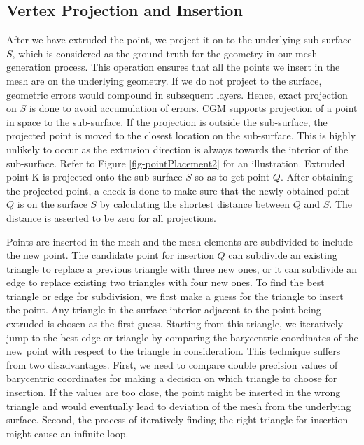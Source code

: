 \subsection{Vertex Projection and Insertion}

After we have extruded the point, we project it on to the underlying sub-surface $S$, which is considered as the ground truth for the geometry in our mesh generation process. This operation ensures that all the  points we insert in the mesh are on the underlying geometry. If we do not project to the surface, geometric errors would compound in subsequent layers. Hence, exact projection on $S$ is done to avoid accumulation of errors. CGM supports projection of a point in space to the sub-surface. If the projection is outside the sub-surface, the projected point is moved to the closest location on the sub-surface. This is highly unlikely to occur as the extrusion direction is always towards the interior of the sub-surface. Refer to Figure \ref{fig-pointPlacement2} for an illustration. Extruded point K is projected onto the sub-surface $S$ so as to get point $Q$. After obtaining the projected point, a check is done to make sure that the newly obtained point $Q$ is on the surface $S$ by calculating the shortest distance between $Q$ and $S$. The distance is asserted to be zero for all projections.

Points are inserted in the mesh and the mesh elements are subdivided to include the new point. The candidate point for insertion $Q$ can subdivide an existing triangle to replace a previous triangle with three new ones, or it can subdivide an edge to replace existing two triangles with four new ones. To find the best triangle or edge for subdivision, we first make a guess for the triangle to insert the point. Any triangle in the surface interior adjacent to the point being extruded is chosen as the first guess. Starting from this triangle, we iteratively jump to the best edge or triangle by comparing the barycentric coordinates of the new point with respect to the triangle in consideration. This technique suffers from two disadvantages. First, we need to compare double precision values of barycentric coordinates for making a decision on which triangle to choose for insertion. If the values are too close, the point might be inserted in the wrong triangle and would eventually lead to deviation of the mesh from the underlying surface. Second, the process of iteratively finding the right triangle for insertion might cause an infinite loop. 

